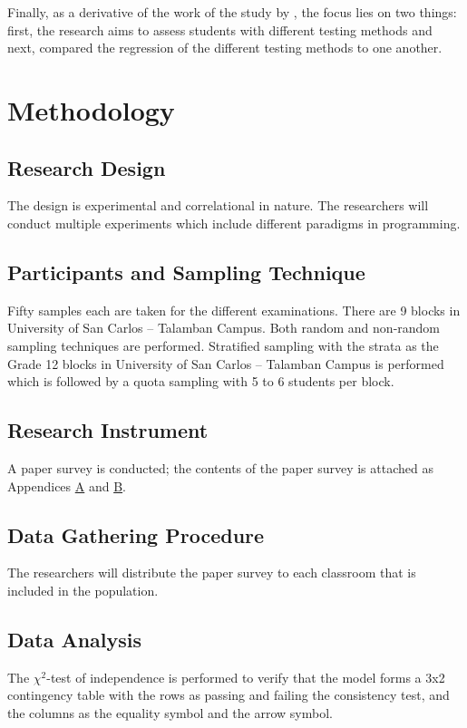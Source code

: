 \documentclass[12pt]{article}
\begin{document}
Finally, as a derivative of the work of the study by \cite{dehnadi2006camel}, 
the focus lies on two things: 
first, the research aims to assess students with different testing methods and 
next, compared the regression of the different testing methods to one another.


\printglossaries

\section{Methodology}
\label{sec:org0fab3d7}
\subsection{Research Design}
\label{sec:org58fe366}
The design is experimental and correlational in nature.  
The researchers will conduct multiple experiments which include different paradigms in programming. 

\subsection{Participants and Sampling Technique}
\label{sec:orga7a4118}
Fifty samples each are taken for the different examinations. 
There are 9 blocks in University of San Carlos -- Talamban Campus.
Both random and non-random sampling techniques are performed. 
Stratified sampling with the strata as the Grade 12 blocks in University of San Carlos -- Talamban Campus is performed
which is followed by a quota sampling with 5 to 6 students per block.

\subsection{Research Instrument}
\label{sec:orga9a9a1f}
A paper survey is conducted; 
the contents of the paper survey is attached as Appendices \hyperref[sec:orgf107c97]{A} and \hyperref[sec:orgc1ee00a]{B}.

\subsection{Data Gathering Procedure}
\label{sec:orge19ca97}
The researchers will distribute the paper survey to each classroom that is included in the population. 

\subsection{Data Analysis}
\label{sec:orgce9507a}
The \(\chi^{\text{2}}\)-test of independence is performed to verify that 
the model forms a 3x2 contingency table 
with the rows as passing and failing the consistency test,
and the columns as the equality symbol and the arrow symbol.
\end{document}
